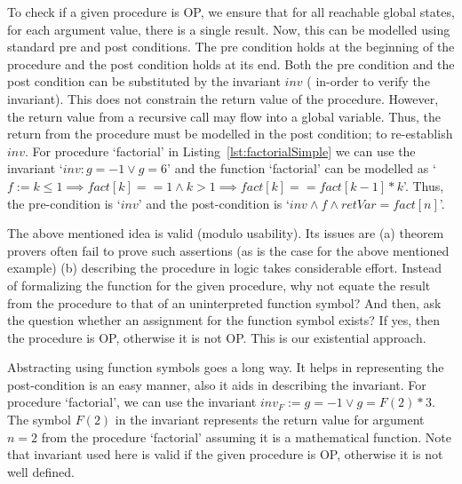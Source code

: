 \documentclass{llncs}
\newcommand{\inv}{\mathit{inv}}
\newcommand{\retVar}{\textit{retVar}}
\newcommand{\F}{\mathit{F}}
\newcommand{\fact}{\mathit{fact}}
\begin{document}
To check if a given procedure is OP, we ensure that for all reachable
global states, for each argument value, there is a single result. Now,
this can be modelled using standard pre and post conditions. The pre
condition holds at the beginning of the procedure and the post
condition holds at its end. Both the pre condition and the post
condition can be substituted by the invariant $\inv$ ( in-order to
verify the invariant). This does not constrain the return value of the
procedure. However, the return value from a recursive call may flow
into a global variable. Thus, the return from the procedure must be
modelled in the post condition; to re-establish $\inv$.  For procedure
`factorial' in Listing~\ref{lst:factorialSimple} we can use the
invariant `$\inv : g = -1 \vee g = 6$' and the function `factorial'
can be modelled as `$ f := k \leq 1 \implies \fact[k] == 1 \wedge k >1
\implies \fact[k] == \fact[k-1]*k$'. Thus, the pre-condition is
`$\inv$' and the post-condition is `$\inv \wedge f \wedge \retVar =
fact[n]$'.

The above mentioned idea is valid (modulo usability). Its issues are
(a) theorem provers often fail to prove such assertions (as is the
case for the above mentioned example) (b) describing the procedure in
logic takes considerable effort.  Instead of formalizing the function
for the given procedure, why not equate the result from the procedure
to that of an uninterpreted function symbol?  And then, ask the
question whether an assignment for the function symbol exists? If yes,
then the procedure is OP, otherwise it is not OP.  This is our
existential approach.

Abstracting using function symbols goes a long way. It helps in
representing the post-condition is an easy manner, also it aids in
describing the invariant. 
For procedure `factorial', we can use the invariant $\inv_{\F}:=g = -1
\vee g = \F(2) * 3$. The symbol $\F(2)$ in the invariant represents
the return value for argument $n = 2$ from the procedure `factorial'
assuming it is a mathematical function. Note that invariant used here
is valid if the given procedure is OP, otherwise it is not well
defined.
\end{document}
